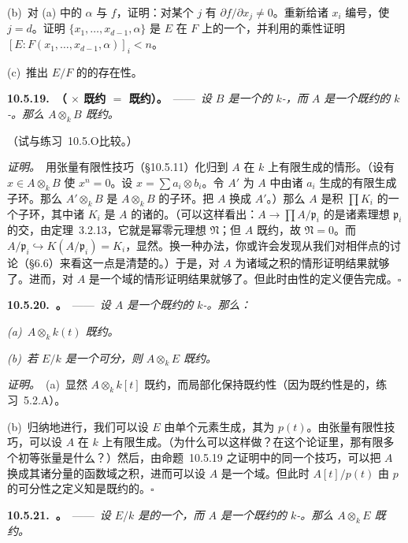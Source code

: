 (b)~对 (a) 中的 $\alpha$ 与 $f$，证明：对某个 $j$ 有 $\partial f/\partial x_j\neq 0$。重新给诸 $x_i$ 编号，使 $j=d$。证明 $\{x_1,\dots,x_{d-1},\alpha\}$ 是 $E$ 在 $F$ 上的一个\trTranscendenceBase{}，并利用\trInseparableDegree{}的乘性证明 $[E:F(x_1,\dots,x_{d-1},\alpha)]_i<n$。

(c)~推出 $E/F$ 的\trSeparatingTranscendenceBase{}的存在性。

\textbf{10.5.19.\ \trhProposition{}（\trGeometricallyReduced{} $\times$ 既约 $=$ 既约）。}\ ——\ \emph{设 $B$ 是一个\trGeometricallyReduced{}的 $k$-\trAlgebra，而 $A$ 是一个既约的 $k$-\trAlgebra。那么 $A\otimes_k B$ 既约。}

（试与\mbox{练习~10.5.O}比较。）

\emph{证明。}\ 用张量有限性技巧（\S10.5.11）化归到 $A$ 在 $k$ 上有限生成的情形。（设有 $x\in A\otimes_k B$ 使 $x^n=0$。设 $x=\sum a_i\otimes b_i$。令 $A'$ 为 $A$ 中由诸 $a_i$ 生成的有限生成子环。那么 $A'\otimes_k B$ 是 $A\otimes_k B$ 的子环。把 $A$ 换成 $A'$。）那么 $A$ 是积 $\prod K_i$ 的一个子环，其中诸 $K_i$ 是 $A$ 的诸\trIrreducibleComponent{}的\trFunctionField。（可以这样看出：$A\to\prod A/\mathfrak{p}_i$ 的\trKernel{}是诸素理想 $\mathfrak{p}_i$ 的交，由定理~3.2.13，它就是幂零元理想 $\mathfrak{N}$；但 $A$ 既约，故 $\mathfrak{N}=0$。而 $A/\mathfrak{p}_i\hookrightarrow K(A/\mathfrak{p}_i)=K_i$，显然。换一种办法，你或许会发现从我们对相伴点的讨论（\S6.6）来看这一点是清楚的。）于是，对 $A$ 为诸域之积的情形证明结果就够了。进而，对 $A$ 是一个域的情形证明结果就够了。但此时由\trGeometricallyReduced{}性的定义便告完成。\hfill$\square$

\textbf{10.5.20.\ \trhProposition{}。}\ ——\ \emph{设 $A$ 是一个既约的 $k$-\trAlgebra。那么：}

\emph{(a)~$A\otimes_k k(t)$ 既约。}

\emph{(b)~若 $E/k$ 是一个\trFinite{}可分\trFieldExtension，则 $A\otimes_k E$ 既约。}

\emph{证明。}\ (a)~显然 $A\otimes_k k[t]$ 既约，而局部化保持既约性（因为既约性是\trStalkLocal{}的，\mbox{练习~5.2.A}）。

(b)~归纳地进行，我们可以设 $E$ 由单个元素生成，其\trMinimalPolynomial{}为 $p(t)$。由张量有限性技巧，可以设 $A$ 在 $k$ 上有限生成。（为什么可以这样做？在这个论证里，那有限多个初等张量是什么？）然后，由命题~10.5.19 之证明中的同一个技巧，可以把 $A$ 换成其诸分量的函数域之积，进而可以设 $A$ 是一个域。但此时 $A[t]/p(t)$ 由 $p$ 的可分性之定义知是既约的。\hfill$\square$

\textbf{10.5.21.\ \trhLemma{}。}\ ——\ \emph{设 $E/k$ 是\trPerfectField{}的一个\trFieldExtension，而 $A$ 是一个既约的 $k$-\trAlgebra。那么 $A\otimes_k E$ 既约。}

